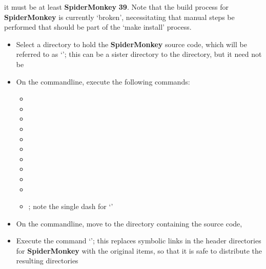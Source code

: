 it must be at least \textbf{SpiderMonkey} \textbf{39}.
Note that the build process for \textbf{SpiderMonkey} is currently `broken', necessitating
that manual steps be performed that should be part of the `make install' process.
\begin{itemize}
\item Select a directory to hold the \textbf{SpiderMonkey} source code, which will be
referred to as `'; this can be a sister directory to the
 directory, but it need not be
\item\exSp{}On the command\longDash{}line, execute the following commands:
\begin{itemize}
\item {}
\item\exSp{}
\item\exSp{}
\item\exSp{}
\item\exSp{}
\item\exSp{}
\item\exSp{}
\item\exSp{}
\item\exSp{}
\item\exSp{}
\item\exSp{}; note
the single dash for `'
\end{itemize}
\item\exSp{}On the command\longDash{}line, move to the directory containing the \mplusm{}
source code, 
\item\exSp{}Execute the command `'; this replaces symbolic links in the
header directories for \textbf{SpiderMonkey} with the original items, so that it is safe
to distribute the resulting directories
\end{itemize}
